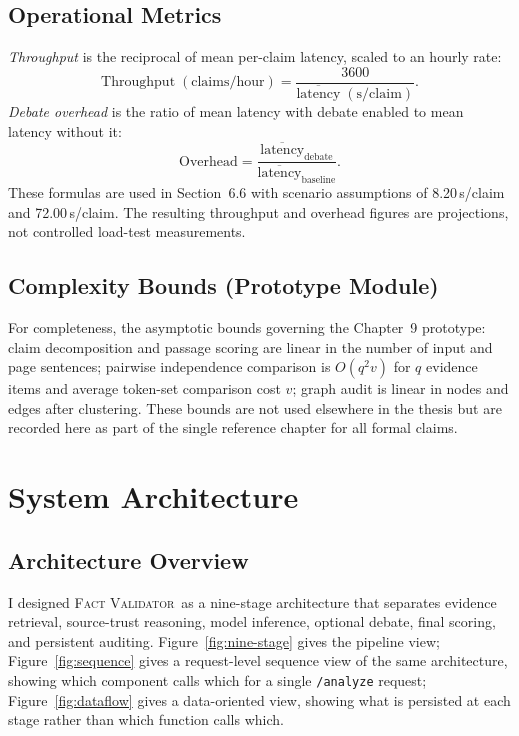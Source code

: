 \documentclass[12pt,a4paper,openany]{report}
\newcommand{\system}{\textsc{Fact Validator}}
\begin{document}
\section{Operational Metrics}
\emph{Throughput} is the reciprocal of mean per-claim latency, scaled to an hourly rate:
\[
\mathrm{Throughput}\;(\mathrm{claims/hour}) = \frac{3600}{\overline{\mathrm{latency}}\;(\mathrm{s/claim})}.
\]
\emph{Debate overhead} is the ratio of mean latency with debate enabled to mean latency without it:
\[
\mathrm{Overhead} = \frac{\overline{\mathrm{latency}}_{\text{debate}}}{\overline{\mathrm{latency}}_{\text{baseline}}}.
\]
These formulas are used in Section~6.6 with scenario assumptions of 8.20\,s/claim and 72.00\,s/claim. The resulting throughput and overhead figures are projections, not controlled load-test measurements.

\section{Complexity Bounds (Prototype Module)}
For completeness, the asymptotic bounds governing the Chapter~9 prototype: claim decomposition and passage scoring are linear in the number of input and page sentences; pairwise independence comparison is $O(q^2v)$ for $q$ evidence items and average token-set comparison cost $v$; graph audit is linear in nodes and edges after clustering. These bounds are not used elsewhere in the thesis but are recorded here as part of the single reference chapter for all formal claims.

\chapter{System Architecture}
\section{Architecture Overview}
I designed \system\ as a nine-stage architecture that separates evidence retrieval, source-trust reasoning, model inference, optional debate, final scoring, and persistent auditing. Figure~\ref{fig:nine-stage} gives the pipeline view; Figure~\ref{fig:sequence} gives a request-level sequence view of the same architecture, showing which component calls which for a single \texttt{/analyze} request; Figure~\ref{fig:dataflow} gives a data-oriented view, showing what is persisted at each stage rather than which function calls which.
\end{document}
